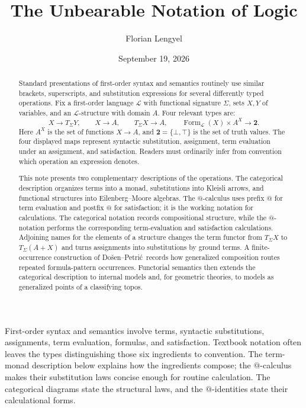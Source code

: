 \documentclass[11pt]{article}
\title{The Unbearable Notation of Logic}
\author{Florian Lengyel}
\date{September 19, 2026}
\makeatletter
\newcommand{\atsign}{\mathord{@}}
\newcommand{\DP}{Do\v{s}en--Petri\'{c}}
\makeatother
\begin{document}
\maketitle

\begin{abstract}
Standard presentations of first-order syntax and semantics routinely use
similar brackets, superscripts, and substitution expressions for several
differently typed operations. Fix a first-order language \(\mathcal L\) with
functional signature \(\Sigma\), sets \(X,Y\) of variables, and an
\(\mathcal L\)-structure with domain \(A\). Four relevant types are:
\[
X\to T_\Sigma Y,\qquad X\to A,\qquad
T_\Sigma X\to A,\qquad
\operatorname{Form}_{\mathcal L}(X)\times A^X\to\mathbf 2.
\]
Here \(A^X\) is the set of functions \(X\to A\), and
\(\mathbf2=\{\bot,\top\}\) is the set of truth values. The four displayed maps
represent syntactic substitution, assignment, term evaluation under an
assignment, and satisfaction. Readers must ordinarily infer from convention
which operation an expression denotes.

This note presents two complementary descriptions of the operations. The categorical
description organizes terms into a monad, substitutions into Kleisli arrows,
and functional structures into Eilenberg--Moore algebras. The $\atsign$-calculus
uses prefix $\atsign$ for term evaluation and postfix $\atsign$ for satisfaction;
it is the working notation for calculations. The categorical notation records
compositional structure, while the $\atsign$-notation performs the corresponding
term-evaluation and satisfaction calculations. Adjoining names for the elements of a structure changes the
term functor from $T_\Sigma X$ to $T_\Sigma(A+X)$ and turns assignments into
substitutions by ground terms. A finite-occurrence construction of \DP\ records
how generalized composition routes repeated formula-pattern occurrences.
Functorial semantics then extends the categorical
description to internal models and, for geometric theories, to models as
generalized points of a classifying topos.
\end{abstract}

First-order syntax and semantics involve terms, syntactic substitutions,
assignments, term evaluation, formulas, and satisfaction. Textbook notation
often leaves the types distinguishing those six ingredients to convention.
The term-monad description below explains how the ingredients compose; the
$\atsign$-calculus makes their substitution laws concise enough for routine
calculation. The categorical diagrams state the structural laws, and the
$\atsign$-identities state their calculational forms.
\end{document}
